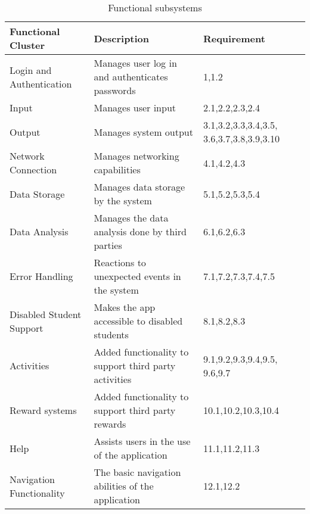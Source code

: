 \documentclass[12pt]{article}
\begin{document}
\begin{table}[h!]
\begin{center}
\begin{tabular}{  |p{5cm}|p{5cm}|p{5cm}| } 
 \hline
 Functional Cluster & Description & Requirement \\ 
 \hline
 Login and Authentication & Manages user log in and authenticates passwords & 1,1.2 \\ 
  \hline
 Input & Manages user input & 2.1,2.2,2.3,2.4 \\ 
  \hline
 Output & Manages system output & 3.1,3.2,3.3,3.4,3.5,
 3.6,3.7,3.8,3.9,3.10 \\ 
  \hline
 Network Connection & Manages networking capabilities & 4.1,4.2,4.3 \\ 
  \hline
 Data Storage & Manages data storage by the system & 5.1,5.2,5.3,5.4 \\ 
  \hline
 Data Analysis & Manages the data analysis done by third parties & 6.1,6.2,6.3 \\ 
  \hline
 Error Handling & Reactions to unexpected events in the system & 7.1,7.2,7.3,7.4,7.5 \\
  \hline 
 Disabled Student Support & Makes the app accessible to disabled students & 8.1,8.2,8.3 \\ 
  \hline
 Activities & Added functionality to support third party activities & 9.1,9.2,9.3,9.4,9.5,
 9.6,9.7 \\  
  \hline
 Reward systems & Added functionality to support third party rewards & 10.1,10.2,10.3,10.4 \\ 
  \hline
 Help & Assists users in the use of the application & 11.1,11.2,11.3 \\ 
  \hline
 Navigation Functionality & The basic navigation abilities of the application & 12.1,12.2 \\ 
 \hline
\end{tabular}
\caption{Functional subsystems}
\label{table:1}
\end{center}
\end{table}
\end{document}
